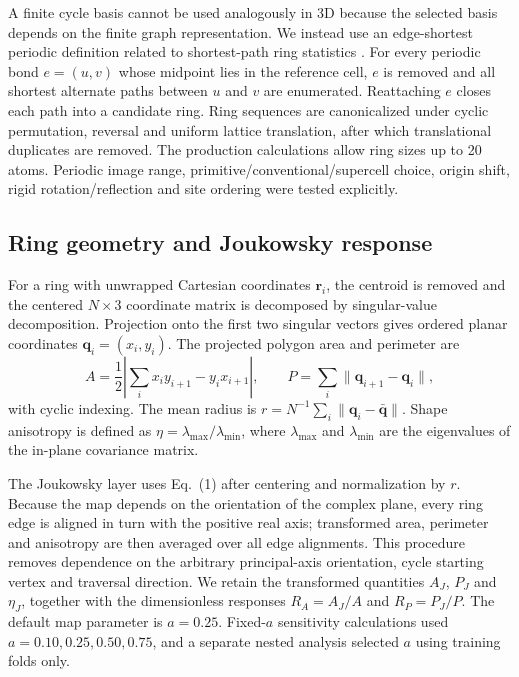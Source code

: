 \documentclass[twoside,twocolumn,9pt]{article}
\begin{document}
A finite cycle basis cannot be used analogously in 3D because the selected basis depends on the finite graph representation. We instead use an edge-shortest periodic definition related to shortest-path ring statistics \cite{Franzblau1991}. For every periodic bond \(e=(u,v)\) whose midpoint lies in the reference cell, \(e\) is removed and all shortest alternate paths between \(u\) and \(v\) are enumerated. Reattaching \(e\) closes each path into a candidate ring. Ring sequences are canonicalized under cyclic permutation, reversal and uniform lattice translation, after which translational duplicates are removed. The production calculations allow ring sizes up to 20 atoms. Periodic image range, primitive/conventional/supercell choice, origin shift, rigid rotation/reflection and site ordering were tested explicitly.

\subsection*{Ring geometry and Joukowsky response}

For a ring with unwrapped Cartesian coordinates \(\mathbf r_i\), the centroid is removed and the centered \(N\times3\) coordinate matrix is decomposed by singular-value decomposition. Projection onto the first two singular vectors gives ordered planar coordinates \(\mathbf q_i=(x_i,y_i)\). The projected polygon area and perimeter are
\begin{equation}
A=\frac{1}{2}\left|\sum_i x_i y_{i+1}-y_i x_{i+1}\right|,
\qquad
P=\sum_i \|\mathbf q_{i+1}-\mathbf q_i\|,
\end{equation}
with cyclic indexing. The mean radius is \(r=N^{-1}\sum_i\|\mathbf q_i-\bar{\mathbf q}\|\). Shape anisotropy is defined as \(\eta=\lambda_{\max}/\lambda_{\min}\), where \(\lambda_{\max}\) and \(\lambda_{\min}\) are the eigenvalues of the in-plane covariance matrix.

The Joukowsky layer uses Eq.~(1) after centering and normalization by \(r\). Because the map depends on the orientation of the complex plane, every ring edge is aligned in turn with the positive real axis; transformed area, perimeter and anisotropy are then averaged over all edge alignments. This procedure removes dependence on the arbitrary principal-axis orientation, cycle starting vertex and traversal direction. We retain the transformed quantities \(A_J\), \(P_J\) and \(\eta_J\), together with the dimensionless responses \(R_A=A_J/A\) and \(R_P=P_J/P\). The default map parameter is \(a=0.25\). Fixed-\(a\) sensitivity calculations used \(a=0.10,0.25,0.50,0.75\), and a separate nested analysis selected \(a\) using training folds only.
\end{document}
